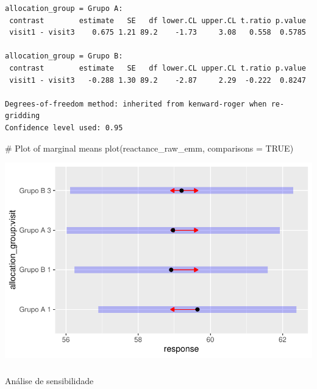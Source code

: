 \documentclass[
  12pt,
]{article}
\makeatletter
\let\oldsubparagraph\subparagraph
\renewcommand{\subparagraph}{
    \@ifstar
      \xxxSubParagraphStar
      \xxxSubParagraphNoStar
  }
\newcommand{\xxxSubParagraphStar}[1]{\oldsubparagraph*{#1}\mbox{}}
\newcommand{\xxxSubParagraphNoStar}[1]{\oldsubparagraph{#1}\mbox{}}
\newenvironment{Shaded}{\begin{snugshade}}{\end{snugshade}}
\newcommand{\AttributeTok}[1]{\textcolor[rgb]{0.40,0.45,0.13}{#1}}
\newcommand{\CommentTok}[1]{\textcolor[rgb]{0.37,0.37,0.37}{#1}}
\newcommand{\ConstantTok}[1]{\textcolor[rgb]{0.56,0.35,0.01}{#1}}
\newcommand{\FunctionTok}[1]{\textcolor[rgb]{0.28,0.35,0.67}{#1}}
\newcommand{\NormalTok}[1]{\textcolor[rgb]{0.00,0.23,0.31}{#1}}
\makeatother
\begin{document}
\begin{verbatim}
allocation_group = Grupo A:
 contrast        estimate   SE   df lower.CL upper.CL t.ratio p.value
 visit1 - visit3    0.675 1.21 89.2    -1.73     3.08   0.558  0.5785

allocation_group = Grupo B:
 contrast        estimate   SE   df lower.CL upper.CL t.ratio p.value
 visit1 - visit3   -0.288 1.30 89.2    -2.87     2.29  -0.222  0.8247

Degrees-of-freedom method: inherited from kenward-roger when re-gridding 
Confidence level used: 0.95 
\end{verbatim}

\begin{Shaded}
\begin{Highlighting}[]
\CommentTok{\# Plot of marginal means}
\FunctionTok{plot}\NormalTok{(reactance\_raw\_emm, }\AttributeTok{comparisons =} \ConstantTok{TRUE}\NormalTok{)}
\end{Highlighting}
\end{Shaded}

\includegraphics{Outcomes_files/figure-pdf/reactance_raw_emm-1.pdf}

\subparagraph{Análise de
sensibilidade}\label{anuxe1lise-de-sensibilidade-18}
\end{document}
